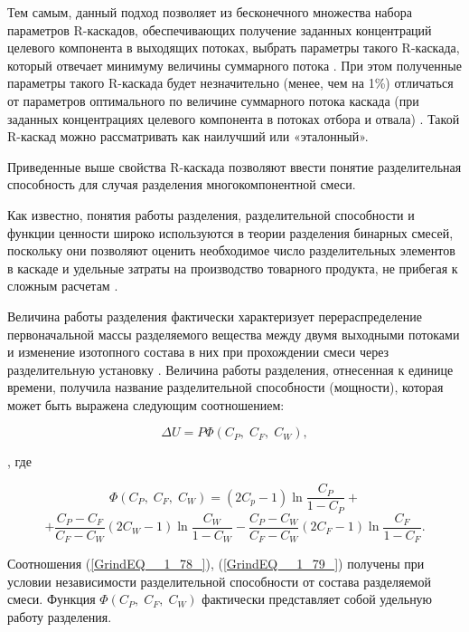 Тем самым, данный подход позволяет из бесконечного множества набора параметров R-каскадов, обеспечивающих получение заданных концентраций целевого компонента в выходящих потоках, выбрать параметры такого R-каскада, который отвечает минимуму величины суммарного потока \cite{sulaberidzeSravnenieOptimalnyhModelnyh2008}. При этом полученные параметры такого R-каскада будет незначительно (менее, чем на 1\%) отличаться от параметров оптимального по величине суммарного потока каскада (при заданных концентрациях целевого компонента в потоках отбора и отвала) \cite{songComparativeStudyModel2010}. Такой R-каскад можно рассматривать как наилучший или «эталонный».

Приведенные выше свойства R-каскада позволяют ввести понятие разделительная способность для случая разделения многокомпонентной смеси. 

Как известно, понятия работы разделения, разделительной способности и функции ценности широко используются в теории разделения бинарных смесей, поскольку они позволяют оценить необходимое число разделительных элементов в каскаде и удельные затраты на производство товарного продукта, не прибегая к сложным расчетам \cite{cohenTheoryIsotopeSeparation1951, rozenTeoriyaRazdeleniyaIzotopov1960, benedictNuclearChemicalEngineering1957}.

Величина работы разделения фактически характеризует перераспределение первоначальной массы разделяемого вещества между двумя выходными потоками и изменение изотопного состава в них при прохождении смеси через разделительную установку \cite{sulaberidzeTeoriyaKaskadovDlya2011}. Величина работы разделения, отнесенная к единице времени, получила название разделительной способности (мощности), которая может быть выражена следующим соотношением:

\begin{equation} \label{GrindEQ__1_78_} 
  \Delta U=P\Phi (C_{P} ,\; C_{F} ,\; C_{W} ),                  
\end{equation} 

, где

\[\Phi (C_{P} ,\; C_{F} ,\; C_{W} )=(2C_{p} -1)\ln \frac{C_{P} }{1-C_{P} } +\] 
\begin{equation} \label{GrindEQ__1_79_} 
+\frac{C_{P} -C_{F} }{C_{F} -C_{W} } (2C_{W} -1)\ln \frac{C_{W} }{1-C_{W} } -\frac{C_{P} -C_{W} }{C_{F} -C_{W} } (2C_{F} -1)\ln \frac{C_{F} }{1-C_{F} } .            
\end{equation}

Соотношения (\ref{GrindEQ__1_78_}), (\ref{GrindEQ__1_79_})  получены при условии независимости разделительной способности от состава разделяемой смеси. Функция $\Phi (C_{P} ,\; C_{F} ,\; C_{W} )$ фактически представляет собой удельную работу разделения.

